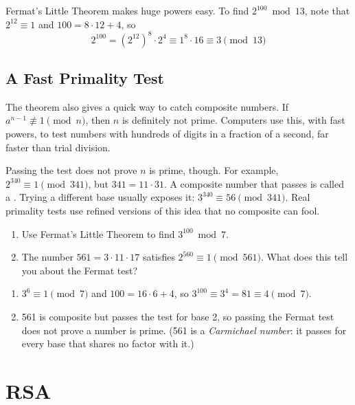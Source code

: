 Fermat's Little Theorem makes huge powers easy. To find $2^{100} \bmod 13$, note
that $2^{12} \equiv 1$ and $100 = 8 \cdot 12 + 4$, so
$$2^{100} = \left(2^{12}\right)^8 \cdot 2^4 \equiv 1^8 \cdot 16 \equiv 3 \pmod{13}$$

\subsection{A Fast Primality Test}
The theorem also gives a quick way to catch composite numbers. If
$a^{n-1} \not\equiv 1 \pmod{n}$, then $n$ is definitely not prime. Computers
use this, with fast powers, to test numbers with hundreds of digits in a
fraction of a second, far faster than trial division.

Passing the test does not prove $n$ is prime, though. For example,
$2^{340} \equiv 1 \pmod{341}$, but $341 = 11 \cdot 31$. A composite number that
passes is called a . Trying a different base usually
exposes it: $3^{340} \equiv 56 \pmod{341}$. Real primality tests use refined
versions of this idea that no composite can fool.

\begin{Exercise}[title={Using Fermat}, label=nt_fermat]
\begin{enumerate}
\item Use Fermat's Little Theorem to find $3^{100} \bmod 7$.
\item The number $561 = 3 \cdot 11 \cdot 17$ satisfies $2^{560} \equiv 1 \pmod{561}$.
What does this tell you about the Fermat test?
\end{enumerate}
\end{Exercise}
\begin{Answer}[ref=nt_fermat]
\begin{enumerate}
\item $3^6 \equiv 1 \pmod 7$ and $100 = 16 \cdot 6 + 4$, so
$3^{100} \equiv 3^4 = 81 \equiv 4 \pmod 7$.
\item 561 is composite but passes the test for base 2, so passing the Fermat
test does not prove a number is prime. (561 is a \emph{Carmichael number}: it
passes for every base that shares no factor with it.)
\end{enumerate}
\end{Answer}

\section{RSA}

